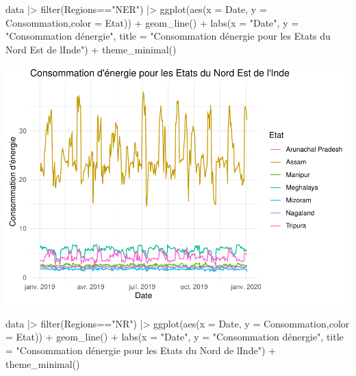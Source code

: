 \documentclass[
]{article}
\newenvironment{Shaded}{\begin{snugshade}}{\end{snugshade}}
\newcommand{\AttributeTok}[1]{\textcolor[rgb]{0.77,0.63,0.00}{#1}}
\newcommand{\FunctionTok}[1]{\textcolor[rgb]{0.00,0.00,0.00}{#1}}
\newcommand{\NormalTok}[1]{#1}
\newcommand{\SpecialCharTok}[1]{\textcolor[rgb]{0.00,0.00,0.00}{#1}}
\newcommand{\StringTok}[1]{\textcolor[rgb]{0.31,0.60,0.02}{#1}}
\begin{document}
\begin{Shaded}
\begin{Highlighting}[]
\NormalTok{data }\SpecialCharTok{|\textgreater{}} 
  \FunctionTok{filter}\NormalTok{(Regions}\SpecialCharTok{==}\StringTok{"NER"}\NormalTok{) }\SpecialCharTok{|\textgreater{}} 
  \FunctionTok{ggplot}\NormalTok{(}\FunctionTok{aes}\NormalTok{(}\AttributeTok{x =}\NormalTok{ Date, }\AttributeTok{y =}\NormalTok{ Consommation,}\AttributeTok{color =}\NormalTok{ Etat)) }\SpecialCharTok{+}
  \FunctionTok{geom\_line}\NormalTok{() }\SpecialCharTok{+}
  \FunctionTok{labs}\NormalTok{(}\AttributeTok{x =} \StringTok{"Date"}\NormalTok{, }\AttributeTok{y =} \StringTok{"Consommation d\textquotesingle{}énergie"}\NormalTok{, }
       \AttributeTok{title =} \StringTok{"Consommation d\textquotesingle{}énergie pour les Etats du Nord Est de l\textquotesingle{}Inde"}\NormalTok{) }\SpecialCharTok{+}
  \FunctionTok{theme\_minimal}\NormalTok{()}
\end{Highlighting}
\end{Shaded}

\includegraphics{Projet_CHESNAIS_GUIBERT_files/figure-latex/unnamed-chunk-17-2.pdf}

\begin{Shaded}
\begin{Highlighting}[]
\NormalTok{data }\SpecialCharTok{|\textgreater{}} 
  \FunctionTok{filter}\NormalTok{(Regions}\SpecialCharTok{==}\StringTok{"NR"}\NormalTok{) }\SpecialCharTok{|\textgreater{}} 
  \FunctionTok{ggplot}\NormalTok{(}\FunctionTok{aes}\NormalTok{(}\AttributeTok{x =}\NormalTok{ Date, }\AttributeTok{y =}\NormalTok{ Consommation,}\AttributeTok{color =}\NormalTok{ Etat)) }\SpecialCharTok{+}
  \FunctionTok{geom\_line}\NormalTok{() }\SpecialCharTok{+}
  \FunctionTok{labs}\NormalTok{(}\AttributeTok{x =} \StringTok{"Date"}\NormalTok{, }\AttributeTok{y =} \StringTok{"Consommation d\textquotesingle{}énergie"}\NormalTok{, }
       \AttributeTok{title =} \StringTok{"Consommation d\textquotesingle{}énergie pour les Etats du Nord de l\textquotesingle{}Inde"}\NormalTok{) }\SpecialCharTok{+}
  \FunctionTok{theme\_minimal}\NormalTok{()}
\end{Highlighting}
\end{Shaded}
\end{document}
